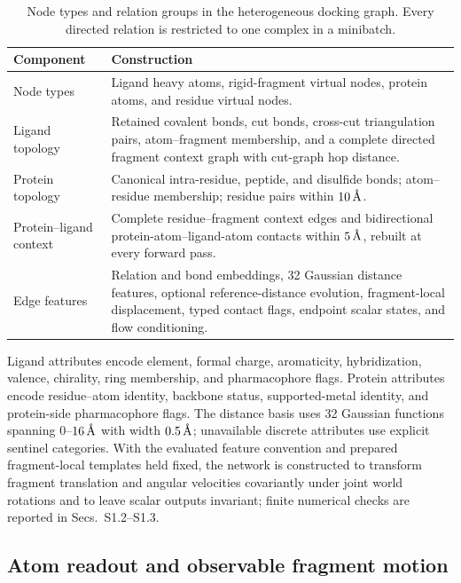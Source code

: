 \documentclass{article}
\newcommand{\angstrom}{\text{\normalfont\AA}}
\begin{document}
\begin{table}[htbp]
    \centering
    \small
    \caption{Node types and relation groups in the heterogeneous docking graph. Every directed relation is restricted to one complex in a minibatch.}
    \label{tab:si_graph_schema}
    \begin{tabularx}{\textwidth}{@{}>{\raggedright\arraybackslash}p{}>{\raggedright\arraybackslash}X@{}}
        \toprule
        Component & Construction \\
        \midrule
        Node types & Ligand heavy atoms, rigid-fragment virtual nodes, protein atoms, and residue virtual nodes. \\
        Ligand topology & Retained covalent bonds, cut bonds, cross-cut triangulation pairs, atom--fragment membership, and a complete directed fragment context graph with cut-graph hop distance. \\
        Protein topology & Canonical intra-residue, peptide, and disulfide bonds; atom--residue membership; residue pairs within \(10\,\angstrom\). \\
        Protein--ligand context & Complete residue--fragment context edges and bidirectional protein-atom--ligand-atom contacts within \(5\,\angstrom\), rebuilt at every forward pass. \\
        Edge features & Relation and bond embeddings, 32 Gaussian distance features, optional reference-distance evolution, fragment-local displacement, typed contact flags, endpoint scalar states, and flow conditioning. \\
        \bottomrule
    \end{tabularx}
\end{table}

Ligand attributes encode element, formal charge, aromaticity, hybridization, valence, chirality, ring membership, and pharmacophore flags.
Protein attributes encode residue--atom identity, backbone status, supported-metal identity, and protein-side pharmacophore flags.
The distance basis uses 32 Gaussian functions spanning \(0\)--\(16\,\angstrom\) with width \(0.5\,\angstrom\); unavailable discrete attributes use explicit sentinel categories.
With the evaluated feature convention and prepared fragment-local templates held fixed, the network is constructed to transform fragment translation and angular velocities covariantly under joint world rotations and to leave scalar outputs invariant; finite numerical checks are reported in Secs.~S1.2--S1.3.

\subsection{Atom readout and observable fragment motion}
\end{document}
